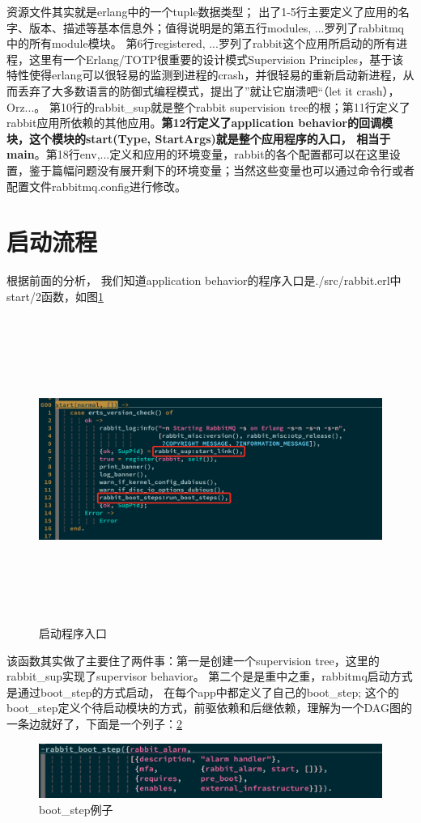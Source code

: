 资源文件其实就是erlang中的一个tuple数据类型； 出了1-5行主要定义了应用的名字、版本、描述等基本信息外；值得说明是的第五行{modules, ...}罗列了rabbitmq中的所有module模块。 第6️行{registered, ...}罗列了rabbit这个应用所启动的所有进程，这里有一个Erlang/TOTP很重要的设计模式Supervision Principles，基于该特性使得erlang可以很轻易的监测到进程的crash，并很轻易的重新启动新进程，从而丢弃了大多数语言的防御式编程模式，提出了”就让它崩溃吧“（let it crash），Orz...。 第10行的rabbit\_sup就是整个rabbit supervision tree的根；第11行定义了rabbit应用所依赖的其他应用。\textbf{第12行定义了application behavior的回调模块，这个模块的start(Type, StartArgs)就是整个应用程序的入口， 相当于main}。第18行{env,...}定义和应用的环境变量，rabbit的各个配置都可以在这里设置，鉴于篇幅问题没有展开剩下的环境变量；当然这些变量也可以通过命令行或者配置文件rabbitmq.config进行修改。


\section{启动流程}
根据前面的分析， 我们知道application behavior的程序入口是./src/rabbit.erl中start/2函数，如图\ref{Fig:ch1/start}
\begin{figure}[h]
	\includegraphics[height=10cm]{img/ch1/start.jpeg}
	\caption{\label{Fig:ch1/start}启动程序入口}
\end{figure}

该函数其实做了主要住了两件事：第一是创建一个supervision tree，这里的rabbit\_sup实现了supervisor behavior。 第二个是是重中之重，rabbitmq启动方式是通过boot\_step的方式启动， 在每个app中都定义了自己的boot\_step; 这个的boot\_step定义个待启动模块的方式，前驱依赖和后继依赖，理解为一个DAG图的一条边就好了，下面是一个列子：\ref{Fig:ch1/boot_step}
\begin{figure}[h]
	\includegraphics[width=\textwidth]{img/ch1/boot_step.jpeg}
	\caption{\label{Fig:ch1/boot_step}boot\_step例子}
\end{figure}

